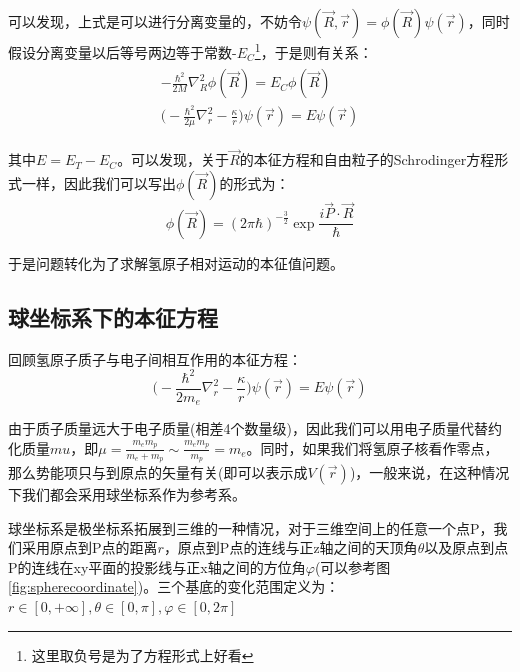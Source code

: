             可以发现，上式是可以进行分离变量的，不妨令$\psi(\vec{R},\vec{r})=\phi(\vec{R})\psi(\vec{r})$，同时假设分离变量以后等号两边等于常数-$E_C$\footnote{这里取负号是为了方程形式上好看}，于是则有关系：
            \begin{align}
                \begin{split}
                    -\frac{\hbar^2}{2M}\nabla_R^2\phi(\vec{R})=E_C\phi(\vec{R})\\
                    \Big(-\frac{\hbar^2}{2\mu}\nabla_r^2-\frac{\kappa}{r}\Big)\psi(\vec{r})=E\psi(\vec{r})
                \end{split}
            \end{align}
            
            其中$E=E_T-E_C$。可以发现，关于$\vec{R}$的本征方程和自由粒子的Schrodinger方程形式一样，因此我们可以写出$\phi(\vec{R})$的形式为：
            \begin{equation}
                \phi(\vec{R})=(2\pi\hbar)^{-\frac{3}{2}}\exp{\frac{i\vec{P}\cdot \vec{R}}{\hbar}}
            \end{equation}
            
            于是问题转化为了求解氢原子相对运动的本征值问题。
        \subsection{球坐标系下的本征方程}
        
        回顾氢原子质子与电子间相互作用的本征方程：
        \begin{equation}\label{equ6:stationaryequB}
            \Big(-\frac{\hbar^2}{2m_e}\nabla_r^2-\frac{\kappa}{r}\Big)\psi(\vec{r})=E\psi(\vec{r})
        \end{equation}
        
        由于质子质量远大于电子质量(相差4个数量级)，因此我们可以用电子质量代替约化质量$mu$，即$\mu=\frac{m_em_p}{m_e+m_p}\sim \frac{m_em_p}{m_p}=m_e$。同时，如果我们将氢原子核看作零点，那么势能项只与到原点的矢量有关(即可以表示成$V(\vec{r})$)，一般来说，在这种情况下我们都会采用球坐标系作为参考系。
        
        球坐标系是极坐标系拓展到三维的一种情况，对于三维空间上的任意一个点P，我们采用原点到P点的距离$r$，原点到P点的连线与正z轴之间的天顶角$\theta$以及原点到点P的连线在xy平面的投影线与正x轴之间的方位角$\varphi$(可以参考图\ref{fig:spherecoordinate})。三个基底的变化范围定义为：$r\in[0,+\infty],\theta\in[0,\pi],\varphi\in[0,2\pi]$
        

